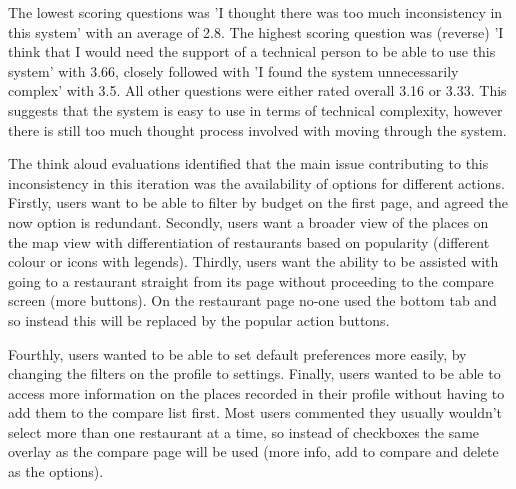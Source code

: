 \documentclass[a4 paper, 12pt]{article}
\begin{document}
   The lowest scoring questions was 'I thought there was too much inconsistency in this system' with an average of 2.8. The highest scoring question was (reverse) 'I think that I would need the support of a technical person to be able to use this system' with 3.66, closely followed with 'I found the system unnecessarily complex' with 3.5. All other questions were either rated overall 3.16 or 3.33. This suggests that the system is easy to use in terms of technical complexity, however there is still too much thought process involved with moving through the system.
   
   The think aloud evaluations identified that the main issue contributing to this inconsistency in this iteration was the availability of options for different actions. Firstly, users want to be able to filter by budget on the first page, and agreed the now option is redundant. Secondly, users want a broader view of the places on the map view with differentiation of restaurants based on popularity (different colour or icons with legends). Thirdly, users want the ability to be assisted with going to a restaurant straight from its page without proceeding to the compare screen (more buttons). On the restaurant page no-one used the bottom tab and so instead this will be replaced by the popular action buttons. 
   
   Fourthly, users wanted to be able to set default preferences more easily, by changing the filters on the profile to settings. Finally, users wanted to be able to access more information on the places recorded in their profile without having to add them to the compare list first. Most users commented they usually wouldn't select more than one restaurant at a time, so instead of checkboxes the same overlay as the compare page will be used (more info, add to compare and delete as the options).
    
\end{document}
